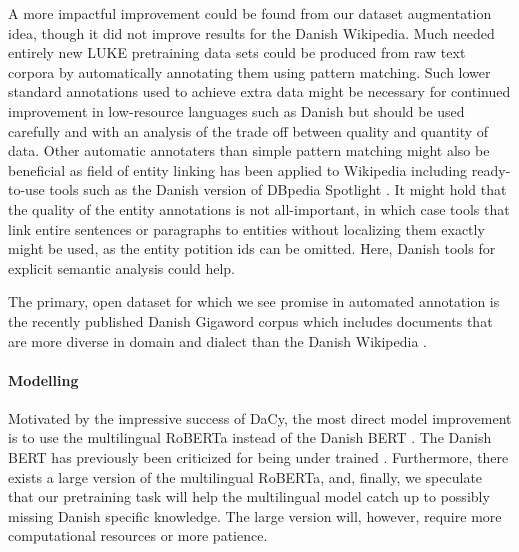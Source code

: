\documentclass[main.tex]{subfiles}
\begin{document}
A more impactful improvement could be found from our dataset augmentation idea, though it did not improve results for the Danish Wikipedia.
Much needed entirely new LUKE pretraining data sets could be produced from raw text corpora by automatically annotating them using pattern matching.
Such lower standard annotations used to achieve extra data might be necessary for continued improvement in low-resource languages such as Danish but should be used carefully and with an analysis of the trade off between quality and quantity of data.
Other automatic annotaters than simple pattern matching might also be beneficial as field of entity linking has been applied to Wikipedia \cite{brochier2021wikilink} including ready-to-use tools such as the Danish version of DBpedia Spotlight \cite{isem2013daiber}.
It might hold that the quality of the entity annotations is not all-important, in which case tools that link entire sentences or paragraphs to entities without localizing them exactly might be used, as the entity potition ids can be omitted.
Here, Danish tools for explicit semantic analysis \cite{hansen2017esa} could help.

The primary, open dataset for which we see promise in automated annotation is the recently published Danish Gigaword corpus which includes documents that are more diverse in domain and dialect than the Danish Wikipedia \cite{derc2021giga}.

\paragraph{Modelling}
Motivated by the impressive success of DaCy, the most direct model improvement is to use the multilingual RoBERTa \cite{conneau2020unsupervised} instead of the Danish BERT \cite{botxo2019dabert}.
The Danish BERT has previously been criticized for being under trained \cite{derc2021giga, nielsen2020textsum}.
Furthermore, there exists a large version of the multilingual RoBERTa, and, finally, we speculate that our pretraining task will help the multilingual model catch up to possibly missing Danish specific knowledge.
The large version will, however, require more computational resources or more patience.
\end{document}
